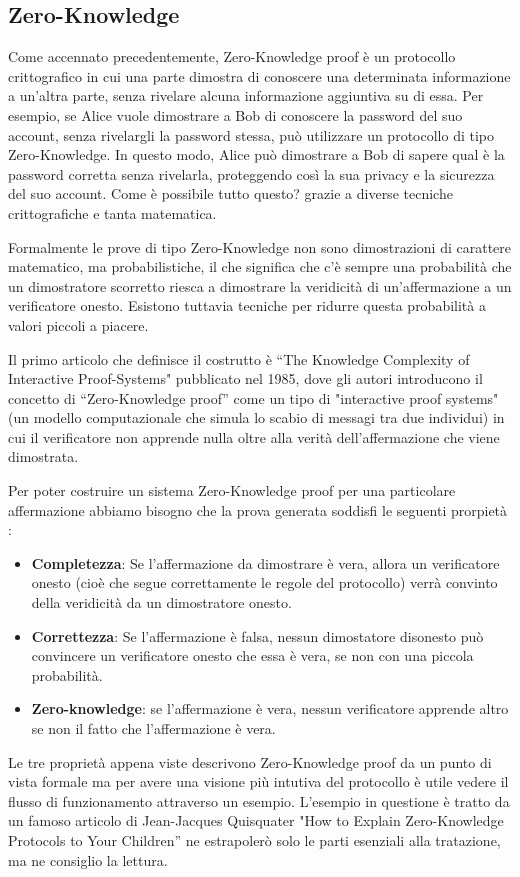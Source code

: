 \subsection{Zero-Knowledge}

Come accennato precedentemente, Zero-Knowledge proof è un protocollo crittografico in cui una parte dimostra di
conoscere una determinata informazione a un'altra parte, senza rivelare alcuna informazione aggiuntiva su di essa. Per
esempio, se Alice vuole dimostrare a Bob di conoscere la password del suo account, senza rivelargli la password stessa,
può utilizzare un protocollo di tipo Zero-Knowledge. In questo modo, Alice può dimostrare a Bob di sapere qual è la
password corretta senza rivelarla, proteggendo così la sua privacy e la sicurezza del suo account. Come è possibile
tutto questo? grazie a diverse tecniche crittografiche e tanta matematica.

Formalmente le prove di tipo Zero-Knowledge non sono dimostrazioni di carattere matematico, ma probabilistiche, il che
significa che c'è sempre una probabilità che un dimostratore scorretto riesca a dimostrare la veridicità di
un'affermazione a un verificatore onesto. Esistono tuttavia tecniche per ridurre questa probabilità a valori piccoli a
piacere.

Il primo articolo che definisce il costrutto è “The Knowledge Complexity of Interactive Proof-Systems"\cite{10.1145/22145.22178} pubblicato nel
1985, dove  gli autori introducono il concetto di “Zero-Knowledge proof” come un tipo di "interactive proof
systems\cite{interactive_proof_system}" (un modello computazionale che simula lo scabio di
messagi tra due individui) in cui il verificatore non apprende nulla oltre alla verità dell'affermazione che viene
dimostrata.

Per poter costruire un sistema Zero-Knowledge proof per una particolare affermazione abbiamo bisogno che la prova
generata soddisfi le seguenti prorpietà :
\begin{itemize}
    \item \textbf{Completezza}: Se l'affermazione da dimostrare è vera, allora un verificatore onesto (cioè che segue correttamente le
    regole del protocollo) verrà convinto della veridicità da un dimostratore onesto.
    \item \textbf{Correttezza}: Se l'affermazione è falsa, nessun dimostatore disonesto può convincere un verificatore onesto che essa è vera, se non con una piccola
    probabilità.
    \item \textbf{Zero-knowledge}: se l'affermazione è vera, nessun verificatore apprende altro se non il fatto che
    l'affermazione è vera.
\end{itemize}
Le tre proprietà appena viste descrivono Zero-Knowledge proof da un punto di vista formale ma per avere una visione più
intutiva del protocollo è utile vedere il flusso di funzionamento attraverso un esempio. L’esempio in questione è tratto
da un famoso articolo di Jean-Jacques Quisquater "How to Explain Zero-Knowledge Protocols to Your Children”\cite{10.1007/0-387-34805-0_60}  ne
estrapolerò solo le parti esenziali alla tratazione, ma ne consiglio la lettura.

